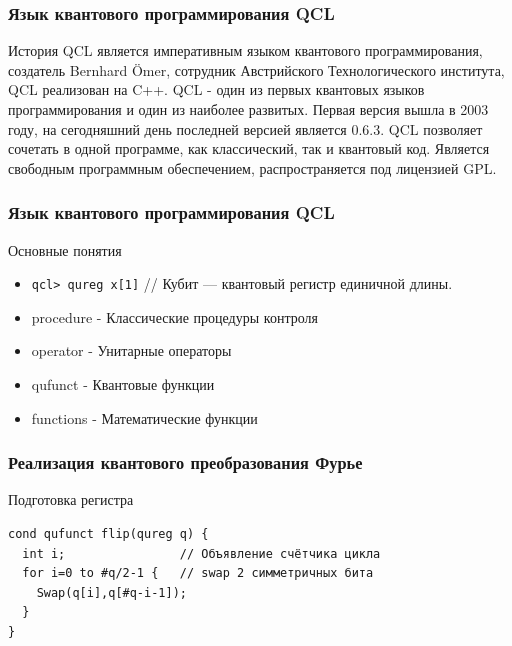 \documentclass{beamer}
\begin{document}
\begin{frame}
 \frametitle{Язык квантового программирования QCL}
 \begin{block}{История}
 QCL является императивным языком квантового программирования, создатель Bernhard Ömer, сотрудник Австрийского Технологического института, QCL реализован на C++. QCL - один из первых квантовых языков программирования и один из наиболее развитых. Первая версия вышла в 2003 году, на сегодняшний день последней версией является 0.6.3. QCL позволяет сочетать в одной программе, как классический, так и квантовый код. Является свободным программным обеспечением, распространяется под лицензией GPL.
\end{block}
\end{frame}

\begin{frame}[fragile]
 \frametitle{Язык квантового программирования QCL}
 \begin{block}{Основные понятия}
 \begin{itemize}
  \item \verb|qcl> qureg x[1]| //  Кубит --- квантовый регистр единичной длины.
  \item procedure - Классические процедуры контроля
  \item operator - Унитарные операторы
  \item qufunct - Квантовые функции
  \item functions - Математические функции
 \end{itemize}
 \end{block}
\end{frame}


\begin{frame}[fragile]
 \frametitle{Реализация квантового преобразования Фурье}
 \begin{block}{Подготовка регистра}
 \begin{verbatim}
cond qufunct flip(qureg q) { 
  int i;                // Объявление счётчика цикла
  for i=0 to #q/2-1 {   // swap 2 симметричных бита
    Swap(q[i],q[#q-i-1]);
  }
}
\end{verbatim}  
 \end{block}
\end{frame}
\end{document}
